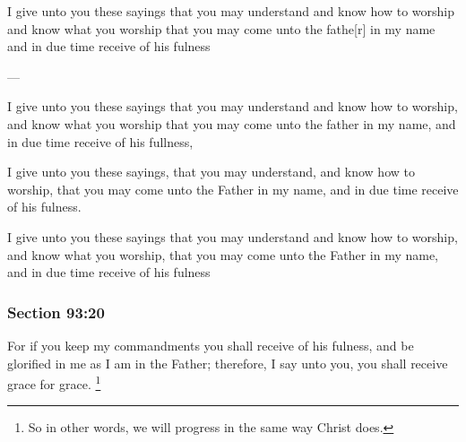 		\begin{framed}
		\scriptsize
			\begin{compactdesc}
				\item[JSP] I give unto you these sayings that you may understand and know how to worship and know what you worship that you may come unto the fathe[r] in my name and in due time receive of his fulness
				\item[BC] ---
				\item[RB2] I give unto you these sayings that you may understand and know how to worship, and know what you worship that you may come unto the father in my name, and in due time receive of his fullness,
				\item[RB1] I give unto you these sayings, that you may understand, and know how to worship, that you may come unto the Father in my name, and in due time receive of his fulness. 
				\item[DC 1835] I give unto you these sayings that you may understand and know how to worship, and know what you worship, that you may come unto the Father in my name, and in due time receive of his fulness 
			\end{compactdesc}
		\end{framed}

	\subsubsection{Section 93:20} %
		\label{DC93-20}

		For if you keep my commandments you shall receive of his fulness, and be glorified in me as I am in the Father; therefore, I say unto you, you shall receive grace for grace.%
			\footnote{%
				So in other words, we will progress in the same way Christ does.
				}

